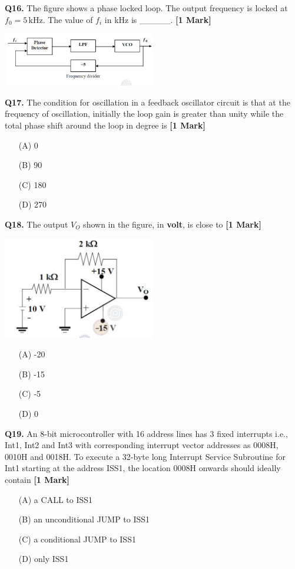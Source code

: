 \documentclass[11pt]{article}
\newcommand{\questiona}[2]{
    \noindent\textbf{Q#2.} #1 \hfill \textbf{[1 Mark]}
}
\begin{document}
\questiona{The figure shows a phase locked loop. The output frequency is locked at \( f_0 = 5 \, \text{kHz} \). The value of \( f_i \) in kHz is \_\_\_\_\_.}{16}
\begin{center}
\includegraphics[width=0.5\textwidth]{figures/16.png}
\end{center}
\vspace{0.5cm}

\questiona{The condition for oscillation in a feedback oscillator circuit is that at the frequency of oscillation, initially the loop gain is greater than unity while the total phase shift around the loop in degree is}{17}
\begin{enumerate}
    \item[(A)] 0  
    \item[(B)] 90  
    \item[(C)] 180  
    \item[(D)] 270
\end{enumerate}
\vspace{0.5cm}

\questiona{The output \( V_O \) shown in the figure, in \textbf{volt}, is close to}{18}
\begin{center}
\includegraphics[width=0.5\textwidth]{figures/18.png}
\end{center}
\begin{enumerate}
    \item[(A)] -20  
    \item[(B)] -15  
    \item[(C)] -5  
    \item[(D)] 0  
\end{enumerate}
\vspace{0.5cm}

\questiona{An 8-bit microcontroller with 16 address lines has 3 fixed interrupts i.e., Int1, Int2 and Int3 with corresponding interrupt vector addresses as 0008H, 0010H and 0018H. To execute a 32-byte long Interrupt Service Subroutine for Int1 starting at the address ISS1, the location 0008H onwards should ideally contain}{19}
\begin{enumerate}
    \item[(A)] a CALL to ISS1  
    \item[(B)] an unconditional JUMP to ISS1  
    \item[(C)] a conditional JUMP to ISS1  
    \item[(D)] only ISS1  
\end{enumerate}
\vspace{0.5cm}
\end{document}
